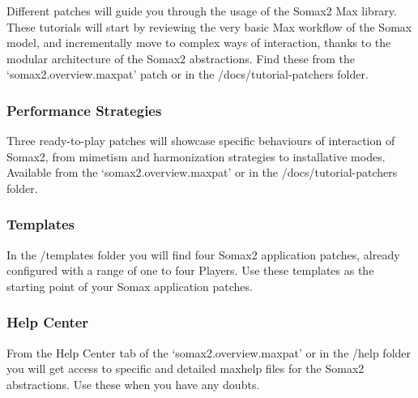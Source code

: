 Different patches will guide you through the usage of the Somax2 Max library. These tutorials will start by reviewing the very basic Max workflow of the Somax model, and incrementally move to complex ways of interaction, thanks to the modular architecture of the Somax2 abstractions. Find these from the `somax2.overview.maxpat' patch or in the /docs/tutorial-patchers folder.

\subsubsection{Performance Strategies}

Three ready-to-play patches will showcase specific behaviours of interaction of Somax2, from mimetism and harmonization strategies to installative modes. Available from the `somax2.overview.maxpat' or in the /docs/tutorial-patchers folder.

\subsubsection{Templates}

In the /templates folder you will find four Somax2 application patches, already configured with a range of one to four Players.
Use these templates as the starting point of your Somax application patches.

\subsubsection{Help Center}

From the Help Center tab of the `somax2.overview.maxpat' or in the /help folder you will get access to specific and detailed maxhelp files for the Somax2 abstractions. Use these when you have any doubts. 

